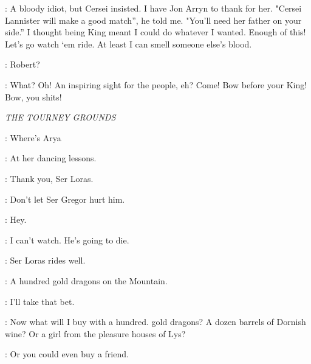 \ROBERT: A bloody idiot, but Cersei insisted. I have Jon Arryn to thank for her. "Cersei Lannister will make a good match'', he told me. "You'll need her father on your side.'' I thought being King meant I could do whatever I wanted. Enough of this! Let's go watch `em ride. At least I can smell someone else's blood.  


\NED: Robert? 

\ROBERT: What?  Oh! An inspiring sight for the people, eh? Come! Bow before your King! Bow, you shits! 

\scene

\textit{THE TOURNEY GROUNDS} 


\NED: Where's Arya 

\SANSA: At her dancing lessons.  


\SANSA: Thank you, Ser Loras. 


\SANSA:  Don't let Ser Gregor hurt him. 

\NED: Hey. 

\SANSA: I can't watch. He's going to die. 

\NED: Ser Loras rides well. 

\LITTLEFINGER:  A hundred gold dragons on the Mountain. 

\RENLY: I'll take that bet. 

\LITTLEFINGER: Now what will I buy with a hundred. gold dragons? A dozen barrels of Dornish wine? Or a girl from the pleasure houses of Lys? 

\RENLY: Or you could even buy a friend. 


